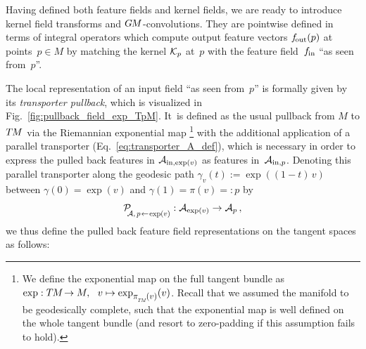 Having defined both feature fields and kernel fields, we are ready to introduce kernel field transforms and $G\mkern-1.4muM$-convolutions.
They are pointwise defined in terms of integral operators which compute output feature vectors $f_\textup{\:\!\!out}(p)$ at points~$p\in M$ by matching the kernel $\mathcal{K}_p$ at~$p$ with the feature field~$f_\textup{\;\!\!in}$ ``as seen from~$p$''.

The local representation of an input field ``as seen from~$p$'' is formally given by its \emph{transporter pullback}, which is visualized in Fig.~\ref{fig:pullback_field_exp_TpM}.
It~is defined as the usual pullback from $M$ to $T\mkern-1.5muM$ via the Riemannian exponential map%
\footnote{
    We define the exponential map on the full tangent bundle as
    $\exp: \TM \!\to M,\ \ v \mapsto \exp_{\scalebox{.85}{$\pi_{\overset{}{\protect\scalebox{.6}{$T\mkern-2muM$}}}\mkern-1mu(v)$}}(v)$.
    Recall that we assumed the manifold to be geodesically complete, such that the exponential map is well defined on the whole tangent bundle (and resort to zero-padding if this assumption fails to hold).
}
with the additional application of a parallel transporter (Eq.~\eqref{eq:transporter_A_def}), which is necessary in order to express the pulled back features in $\mathcal{A}_{\textup{in},\exp(v)}$ as features in~$\mathcal{A}_{\textup{in},p}$.
Denoting this parallel transporter along the geodesic path $\gamma_v(t) := \exp((1-t) \,v)$ between $\gamma(0) = \exp(v)$ and $\gamma(1) = \pi(v) =: p$ by
\begin{align}
    \mathcal{P}_{\mkern-4mu\overset{}{\protect\scalebox{.75}{$\!\A$},\protect\scalebox{.75}{$\, p\!\leftarrow\!\exp(v)$}}}
    : \A_{\exp(v)} \to \A_p \,,
\end{align}
we thus define the pulled back feature field representations on the tangent spaces as follows:
